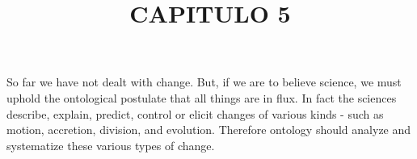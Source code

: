 \documentclass[12pt]{article}
\title{\large CAPITULO 5}
\date{}
\begin{document}
\maketitle

\begin{justifying}
  \noindent So far we have not dealt with change. But, if we are to believe science,
we must uphold the ontological postulate that all things are in flux. In
fact the sciences describe, explain, predict, control or elicit changes of
various kinds - such as motion, accretion, division, and evolution.
Therefore ontology should analyze and systematize these various types
of change.
\end{justifying}



\printbibliography
\end{document}
